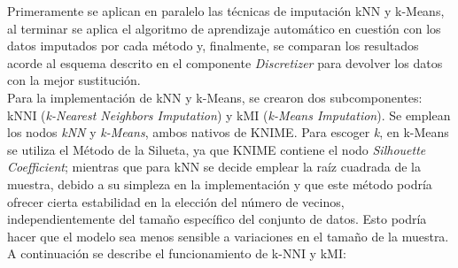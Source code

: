 Primeramente se aplican en paralelo las técnicas de imputación kNN y k-Means, al terminar se aplica el algoritmo de aprendizaje automático en cuestión con los datos imputados por cada método y, finalmente, se comparan los resultados acorde al esquema descrito en el componente \textit{Discretizer} para devolver los datos con la mejor sustitución. \\
Para la implementación de kNN y k-Means, se crearon dos subcomponentes: kNNI (\textit{k-Nearest Neighbors Imputation}) y kMI (\textit{k-Means Imputation}). Se emplean los nodos \textit{kNN} y \textit{k-Means}, ambos nativos de KNIME. Para escoger \textit{k}, en k-Means se utiliza el Método de la Silueta, ya que KNIME contiene el nodo \textit{Silhouette Coefficient}; mientras que para kNN se decide emplear la raíz cuadrada de la muestra, debido a su simpleza en la implementación y que este método podría ofrecer cierta estabilidad en la elección del número de vecinos, independientemente del tamaño específico del conjunto de datos. Esto podría hacer que el modelo sea menos sensible a variaciones en el tamaño de la muestra. A continuación se describe el funcionamiento de k-NNI y kMI:

